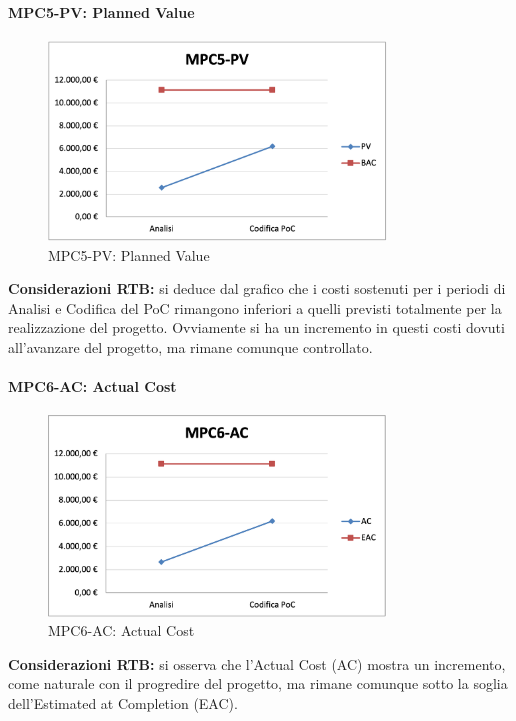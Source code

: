 \paragraph{MPC5-PV: Planned Value}
\begin{figure}[h!]
    \centering
    \includegraphics[width=0.8\textwidth]{images/MPC5-PV.png}
    \caption{MPC5-PV: Planned Value}
\end{figure}
\noindent \textbf{Considerazioni RTB:} si deduce dal grafico che i costi sostenuti per i periodi di Analisi e Codifica del PoC rimangono inferiori a quelli previsti totalmente per la realizzazione del progetto. Ovviamente si ha un incremento in questi costi dovuti all'avanzare del progetto, ma rimane comunque controllato.

\newpage
\paragraph{MPC6-AC: Actual Cost}
\begin{figure}[h!] 
    \centering
    \includegraphics[width=0.8\textwidth]{images/MPC6-AC.png}
    \caption{MPC6-AC: Actual Cost}
\end{figure}
\noindent \textbf{Considerazioni RTB:} si osserva che l’Actual Cost (AC) mostra un incremento, come naturale con il progredire del progetto, ma rimane comunque sotto la soglia dell'Estimated at Completion (EAC). 

